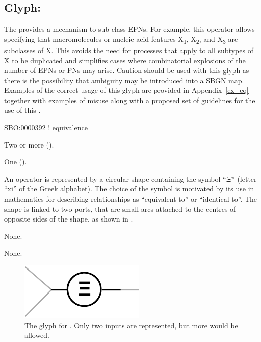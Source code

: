 \subsection{Glyph: }
\label{sec:equivalence}

The  provides a mechanism to sub-class EPNs. For example, this operator allows specifying that macromolecules or nucleic acid features X\textsubscript{1}, X\textsubscript{2}, and X\textsubscript{3} are subclasses of X. This avoids the need for processes that apply to all subtypes of X to be duplicated and simplifies cases where combinatorial explosions of the number of EPNs or PNs may arise. Caution should be used with this glyph as there is the possibility that ambiguity may be introduced into a SBGN map. Examples of the correct usage of this glyph are provided in Appendix~\ref{ex_eq} together with examples of misuse along with a proposed set of guidelines for the use of this .

\begin{glyphDescription}

\glyphSboTerm
SBO:0000392 ! equivalence


\glyphIncoming Two or more  ().



\glyphOutgoing
One  ().


\glyphContainer
An  operator is represented by a circular shape containing the symbol ``$\Xi$'' (letter ``xi'' of the Greek alphabet).
The choice of the symbol is motivated by its use in mathematics for describing relationships as ``equivalent to'' or ``identical to''.
% 
The shape is linked to two ports, that are small arcs attached to the centres of opposite sides of the shape, as shown in .


\glyphLabel
None.

\glyphAux
None.

\end{glyphDescription}

\begin{figure}[H]
  \centering
  \includegraphics{images/build/equivalence.pdf}
  \caption{The \PD glyph for . Only two inputs are represented, but more would be allowed.}
  \label{fig:equivalenceOperator}
\end{figure}


